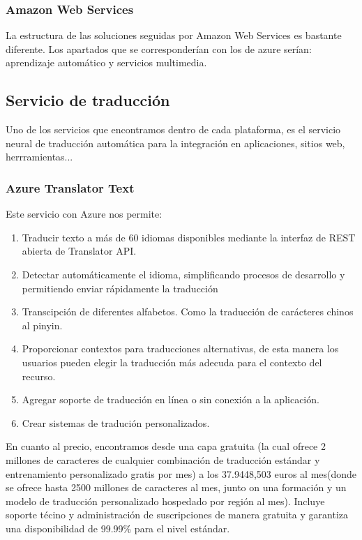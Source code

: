 \documentclass[runningheads]{llncs}
\begin{document}
    \subsubsection{Amazon Web Services}
    La estructura de las soluciones seguidas por Amazon Web Services es bastante diferente. Los apartados que se corresponderían con los de azure serían: aprendizaje automático y servicios multimedia.


\subsection{Servicio de traducción}
Uno de los servicios que encontramos dentro de cada plataforma, es el servicio neural de traducción automática para la integración en aplicaciones, sitios web, herrramientas...
    \subsubsection{Azure Translator Text}
Este servicio con Azure nos permite:
\begin{enumerate}
    \item Traducir texto a más de 60 idiomas disponibles mediante la interfaz de REST abierta de Translator API.
    \item Detectar automáticamente el idioma, simplificando procesos de desarrollo y permitiendo enviar rápidamente la traducción
    \item Transcipción de diferentes alfabetos. Como la traducción de carácteres chinos al pinyin.
    \item Proporcionar contextos para traducciones alternativas, de esta manera los usuarios pueden elegir la traducción más adecuda para el contexto del recurso.
    \item Agregar soporte de traducción en línea o sin conexión a la aplicación.
    \item Crear sistemas de tradución personalizados.
\end{enumerate}{}
En cuanto al precio, encontramos desde una capa gratuita (la cual ofrece 2 millones de caracteres de cualquier combinación de traducción estándar y entrenamiento personalizado gratis por mes) a los 37.9448,503 euros al mes(donde se ofrece hasta 2500 millones de caracteres al mes, junto on una formación y un modelo de traducción personalizado hospedado por región al mes). Incluye soporte técino y administración de suscripciones de manera gratuita y garantiza una disponibilidad de 99.99\% para el nivel estándar.
\end{document}
